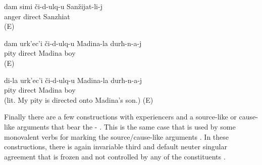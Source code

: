 \begin{exe} 
\ex	\label{ex:PITYangry}
\begin{xlist}
		\ex {} 
		\ex {} 
\end{xlist}

	\ex	\label{ex:‎‎I am angry with Sanzhiat}
	\gll	dam	simi	či-d-ulq-u	Sanžijat-li-j\\
			anger	direct	Sanzhiat\\
	\glt	{} (E)
	
			\ex	\label{ex:I pity Madina's sons@b}
		\gll	dam	urk'ec'i	či-d-ulq-u	Madina-la	durħ-n-a-j\\
				pity	direct Madina	boy\\
		\glt	{} (E)

		\ex	\label{ex:I pity Madina's sons@c}
		\gll	di-la	urk'ec'i	či-d-ulq-u	Madina-la	durħ-n-a-j\\
				pity	direct Madina	boy\\
		\glt	{} (lit. My pity is directed onto Madina's son.) (E)	
\end{exe}

Finally there are a few constructions with  experiencers and a source-like or cause-like  arguments that bear the - . This is the same case that is used by some monovalent  verbs for marking the source/cause-like arguments . In these constructions, there is again invariable third  and default neuter singular  agreement that is frozen and not controlled by any of the constituents .

\begin{exe} 
\ex \label{embarrassed constructions}
	\begin{xlist}
		\ex	{}  
		\ex	{} 
		\ex	{} 
	\end{xlist}
	\end{exe}
	
